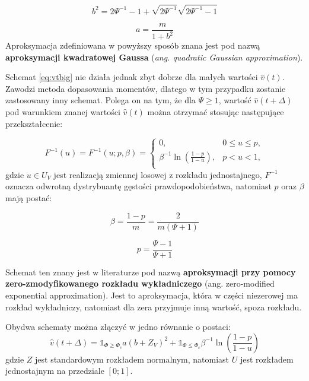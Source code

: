 \documentclass{pracamgr}
\begin{document}
\begin{equation}
\label{eq:b}
b^2 = 2 \Psi^{-1} - 1 + \sqrt{2 \Psi^{-1}} \sqrt{2 \Psi^{-1} - 1}
\end{equation}

\begin{equation}
\label{eq:a}
a = \frac{m}{1 + b^2}
\end{equation}
Aproksymacja zdefiniowana w powyższy sposób znana jest pod nazwą 
\textbf{aproksymacji kwadratowej Gaussa} (\textit{ang. quadratic Gaussian approximation}).


Schemat \ref{eq:vtbig} nie działa jednak zbyt dobrze dla małych wartości $\hat{v}(t)$. Zawodzi metoda 
dopasowania momentów, dlatego w tym przypadku 
zostanie zastosowany inny schemat. Polega on na tym, że dla $\Psi \geq 1$, wartość 
$\hat{v}(t + \Delta)$ pod warunkiem znanej wartości $\hat{v}(t)$ można otrzymać 
stosując następujące przekształcenie:

\begin{equation}
\label{eq:psi}
F^{-1}(u) = F^{-1}(u;p,\beta) = \begin{cases}
               0, & 0 \le u \leq p,\\
               \beta^{-1} \ln (\frac{1-p}{1-u}), & p < u < 1, \\
            \end{cases} 
\end{equation} 
gdzie $u \in U_V$ jest realizacją zmiennej losowej z rozkładu jednostajnego, $F^{-1}$ oznacza
odwrotną dystrybuantę gęstości prawdopodobieństwa, natomiast $p$ oraz $\beta$ mają postać:

\begin{equation}
\label{eq:beta}
\beta = \frac{1-p}{m} = \frac{2}{m(\Psi + 1)}
\end{equation}

\begin{equation}
\label{eq:p}
p = \frac{\Psi - 1}{\Psi + 1}
\end{equation}

Schemat ten znany jest w literaturze pod nazwą \textbf{aproksymacji przy pomocy zero-zmodyfikowanego rozkładu
wykładniczego} (ang. zero-modified exponential approximation). 
Jest to aproksymacja, która w części niezerowej ma 
rozkład wykładniczy, natomiast dla zera przyjmuje inną wartość, spoza rozkładu. 


Obydwa schematy można złączyć w jedno równanie o postaci:
\begin{equation}
\label{eq:andersen}
\hat{v}(t + \Delta)  = \mathds{1}_{\Phi \geq \Phi_c} a (b + Z_V)^2
 + \mathds{1}_{\Phi \le \Phi_c} \beta^{-1} \ln (\frac{1-p}{1-u})
\end{equation}
gdzie $Z$ jest standardowym rozkładem normalnym, natomiast $U$ jest rozkładem jednostajnym na 
przedziale $[0;1]$.
\end{document}
